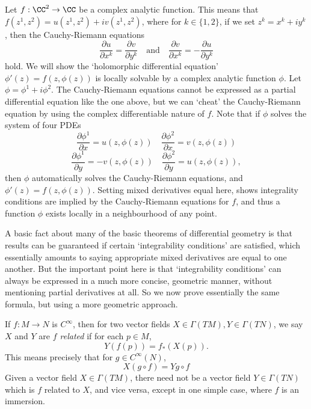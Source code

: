 \begin{example}
    Let $f: \CC^2 \to \CC$ be a complex analytic function. This means that $f(z^1,z^2) = u(z^1,z^2) + iv(z^1,z^2)$, where for $k \in \{ 1, 2 \}$, if we set $z^k = x^k + i y^k$, then the Cauchy-Riemann equations
    \[ \frac{\partial u}{\partial x^k} = \frac{\partial v}{\partial y^k} \quad\text{and}\quad \frac{\partial v}{\partial x^k} = - \frac{\partial u}{\partial y^k} \]
    hold. We will show the `holomorphic differential equation' $\phi'(z) = f(z,\phi(z))$ is locally solvable by a complex analytic function $\phi$. Let $\phi = \phi^1 + i \phi^2$. The Cauchy-Riemann equations cannot be expressed as a partial differential equation like the one above, but we can `cheat' the Cauchy-Riemann equation by using the complex differentiable nature of $f$. Note that if $\phi$ solves the system of four PDEs
    \[ \frac{\partial \phi^1}{\partial x} = u(z,\phi(z)) \quad \frac{\partial \phi^2}{\partial x} = v(z,\phi(z)) \]
    \[ \frac{\partial \phi^1}{\partial y} = -v(z,\phi(z)) \quad \frac{\partial \phi^2}{\partial y} = u(z,\phi(z)), \]
    then $\phi$ automatically solves the Cauchy-Riemann equations, and $\phi'(z) = f(z,\phi(z))$. Setting mixed derivatives equal here, shows integrality conditions are implied by the Cauchy-Riemann equations for $f$, and thus a function $\phi$ exists locally in a neighbourhood of any point.
\end{example}

A basic fact about many of the basic theorems of differential geometry is that results can be guaranteed if certain `integrability conditions' are satisfied, which essentially amounts to saying appropriate mixed derivatives are equal to one another. But the important point here is that `integrability conditions' can always be expressed in a much more concise, geometric manner, without mentioning partial derivatives at all. So we now prove essentially the same formula, but using a more geometric approach.

If $f:M \to N$ is $C^\infty$, then for two vector fields $X \in \Gamma(TM), Y \in \Gamma(TN)$, we say $X$ and $Y$ are \emph{$f$ related} if for each $p \in M$,
%
\[ Y(f(p)) = f_*(X(p)). \]
%
This means precisely that for $g \in C^\infty(N)$,
%
\[ X ( g \circ f ) = Yg \circ f \]
Given a vector field $X \in \Gamma(TM)$, there need not be a vector field $Y \in \Gamma(TN)$ which is $f$ related to $X$, and vice versa, except in one simple case, where $f$ is an immersion.

